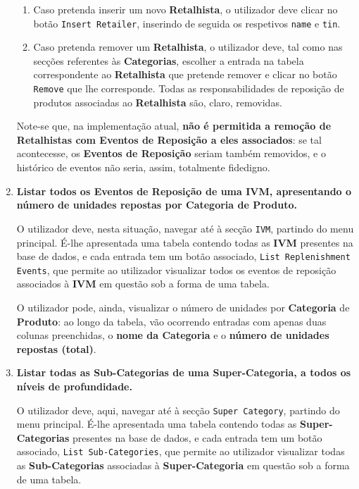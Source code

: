 \documentclass[12pt,a4paper]{article}
\begin{document}
\begin{enumerate}
        \begin{enumerate}
          \item Caso pretenda inserir um novo \textbf{Retalhista}, o utilizador
                deve clicar no botão \texttt{Insert Retailer}, inserindo de seguida os respetivos
                \texttt{name} e \texttt{tin}.

          \item Caso pretenda remover um \textbf{Retalhista}, o utilizador deve, tal
                como nas secções referentes às \textbf{Categorias}, escolher a entrada na
                tabela correspondente ao \textbf{Retalhista} que pretende remover e clicar
                no botão \texttt{Remove} que lhe corresponde. Todas as responsabilidades
                de reposição de produtos associadas ao \textbf{Retalhista} são, claro, removidas.
        \end{enumerate}

        Note-se que, na implementação atual, \textbf{não é permitida a remoção de Retalhistas
          com Eventos de Reposição a eles associados}: se tal acontecesse, os \textbf{Eventos
          de Reposição} seriam também removidos, e o histórico de eventos não seria, assim,
        totalmente fidedigno.

  \item \textbf{Listar todos os Eventos de Reposição de uma IVM, apresentando
          o número de unidades repostas por Categoria de Produto.}

        O utilizador deve, nesta situação, navegar até à secção \texttt{IVM},
        partindo do menu principal. É-lhe apresentada uma tabela contendo todas as
        \textbf{IVM} presentes na base de dados, e cada entrada tem um botão
        associado, \texttt{List Replenishment Events}, que permite ao utilizador
        visualizar todos os eventos de reposição associados à \textbf{IVM} em questão
        sob a forma de uma tabela.

        O utilizador pode, ainda, visualizar o número
        de unidades por \textbf{Categoria} de \textbf{Produto}: ao longo da tabela,
        vão ocorrendo entradas com apenas duas colunas preenchidas, o \textbf{nome
          da Categoria} e o \textbf{número de unidades repostas (total)}.

  \item \textbf{Listar todas as Sub-Categorias de uma Super-Categoria, a todos
          os níveis de profundidade.}

        O utilizador deve, aqui, navegar até à secção \texttt{Super Category},
        partindo do menu principal. É-lhe apresentada uma tabela contendo todas as
        \textbf{Super-Categorias} presentes na base de dados, e cada entrada tem um
        botão associado, \texttt{List Sub-Categories}, que permite ao utilizador
        visualizar todas as \textbf{Sub-Categorias} associadas à \textbf{Super-Categoria}
        em questão sob a forma de uma tabela.


\end{enumerate}
\end{document}
